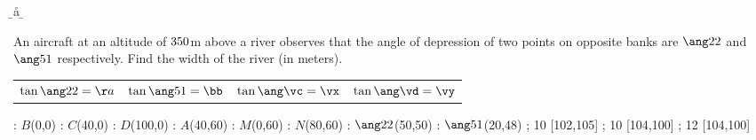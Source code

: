 

\va\vc
{}\vb\vd
\DEGREESTAN\vc\vm
\DEGREESTAN\vd\vn
\ROUND[2]\vm\vx
\ROUND[2]\vn\vy
\ADD\vx\vy\vz
\MULTIPLY\vh\vz\vv
\ROUND[2]\vv\vw

\DEGREESTAN\va\a
\DEGREESTAN\vb\b
\ROUND[2]\a\aa
\ROUND[2]\b\bb

\question[2] An aircraft at an altitude of $350$m above a river observes that the angle 
of depression of two points on opposite banks are $\ang\va$ and $\ang\vb$ respectively.
Find the width of the river (in meters).

\watchout

\begin{calcaid}
  \begin{tabular}{c c c c}
    $\tan\ang\va=\aa$ & $\tan\ang\vb=\bb$ & $\tan\ang\vc=\vx$ & $\tan\ang\vd=\vy$ 
  \end{tabular}
\end{calcaid}

\ifprintanswers
    \vspace{0.5cm}
      : $B$(0,0)
      : $C$(40,0)
      : $D$(100,0)
      : $A$(40,60)
      : $M$(0,60)
      : $N$(80,60)
      : $\ang\va$(50,50) %
      : $\ang\vb$(20,48)
    \figdrawbegin{}
      \figdrawline [100,103,102,101,100]
      \figdrawline [103,101]
      \figdrawline [104,105]
       ; 10 [102,105] 
       ; 10 [104,100] 
       ; 12 [104,100] 
    \figdrawend
    \centerline{\box\figBoxA}
\fi 

